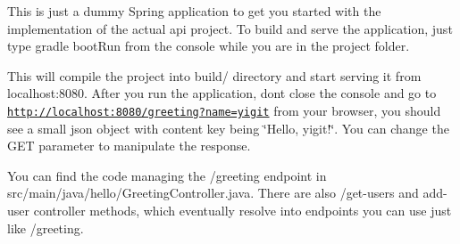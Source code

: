 This is just a dummy Spring application to get you started with the implementation of the actual api project. To build and serve the application, just type {\ttfamily gradle boot\+Run} from the console while you are in the project folder.

This will compile the project into {\ttfamily build/} directory and start serving it from {\ttfamily localhost\+:8080}. After you run the application, don\textquotesingle{}t close the console and go to {\ttfamily \href{http://localhost:8080/greeting?name=yigit}{\tt http\+://localhost\+:8080/greeting?name=yigit}} from your browser, you should see a small json object with {\ttfamily content} key being \char`\"{}\+Hello, yigit!\char`\"{}. You can change the {\ttfamily G\+ET} parameter to manipulate the response.

You can find the code managing the {\ttfamily /greeting} endpoint in {\ttfamily src/main/java/hello/\+Greeting\+Controller.\+java}. There are also {\ttfamily /get-\/users} and {\ttfamily add-\/user} controller methods, which eventually resolve into endpoints you can use just like {\ttfamily /greeting}. 